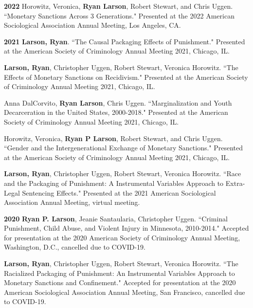 \documentclass[letterpaper]{article}
\newenvironment{publist}{%
  \begin{list}{}{%
    \setlength{\leftmargin}{0cm}   %
    \setlength{\labelwidth}{2cm}     %
    \setlength{\labelsep}{0.5cm}     %
  }%
}{%
  \end{list}%
}
\begin{document}
\begin{publist}
\item[\textbf{2022}] Horowitz, Veronica, \textbf{Ryan Larson}, Robert Stewart, and Chris Uggen. ``Monetary Sanctions Across 3 Generations." Presented at the 2022 American Sociological Association Annual Meeting, Los Angeles, CA. 

\item[\textbf{2021}] \textbf{Larson, Ryan}. ``The Causal Packaging Effects of Punishment." Presented at the American Society of Criminology Annual Meeting 2021, Chicago, IL. 

\item \textbf{Larson, Ryan}, Christopher Uggen, Robert Stewart, Veronica Horowitz. ``The Effects of Monetary Sanctions on Recidivism." Presented at the American Society of Criminology Annual Meeting 2021, Chicago, IL. 

\item Anna DalCorvito, \textbf{Ryan Larson}, Chris Uggen. ``Marginalization and Youth Decarceration in the United States, 2000-2018." Presented at the American Society of Criminology Annual Meeting 2021, Chicago, IL. 

\item Horowitz, Veronica, \textbf{Ryan P Larson}, Robert Stewart, and Chris Uggen. ``Gender and the Intergenerational Exchange of Monetary Sanctions." Presented at the American Society of Criminology Annual Meeting 2021, Chicago, IL. 

\item \textbf{Larson, Ryan}, Christopher Uggen, Robert Stewart, Veronica Horowitz. ``Race and the Packaging of Punishment: A Instrumental Variables Approach to Extra-Legal Sentencing Effects." Presented at the 2021 American Sociological Association Annual Meeting, virtual meeting. 

\item[\textbf{2020}] \textbf{Ryan P. Larson}, Jeanie Santaularia, Christopher Uggen. ``Criminal Punishment, Child Abuse, and Violent Injury in Minnesota, 2010-2014." Accepted for presentation at the 2020 American Society of Criminology Annual Meeting, Washington, D.C., cancelled due to COVID-19.  

\item \textbf{Larson, Ryan}, Christopher Uggen, Robert Stewart, Veronica Horowitz. ``The Racialized Packaging of Punishment: An Instrumental Variables Approach to Monetary Sanctions and Confinement." Accepted for presentation at the 2020 American Sociological Association Annual Meeting, San Francisco, cancelled due to COVID-19. 


\end{publist}
\end{document}
